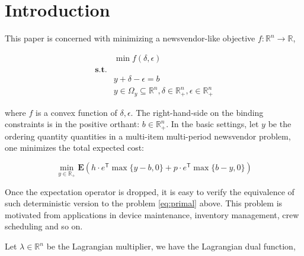 \documentclass[../main]{subfiles}
\begin{document}
\maketitle
{
  \setcounter{tocdepth}{3}
  \tableofcontents
}


\section{Introduction}\label{sec:introduction}

This paper is concerned with minimizing a newsvendor-like objective \(f: \mathbb R^n \to \mathbb R\),

\begin{equation}\label{eq:primal}
  \begin{aligned}
                  & \min f(\delta, \epsilon)                                                                       \\
    \mathbf{s.t.} &                                                                                                \\
                  & y + \delta - \epsilon = b                                                                      \\
                  & y \in \Omega_y \subseteq \mathbb{R}^n, \delta \in \mathbb{R}^n_+ , \epsilon \in \mathbb{R}^n_+
  \end{aligned}
\end{equation}

where \(f\) is a convex function of \(\delta, \epsilon\). The
right-hand-side on the binding constraints is in the positive orthant:
\(b \in \mathbb R_+^n\).  In the basic
settings, let \(y\) be the ordering quantity quantities in a multi-item multi-period
newsvendor problem, one minimizes the total expected cost:

\[\min_{y \in \mathbb R_+} \mathbf E\left(h\cdot e^\mathsf{T} \max\{y - b,  0\} + p \cdot e^\mathsf{T} \max\{b - y,  0\}\right)\]

Once the expectation operator is dropped, it is easy to verify the equivalence of such deterministic version
to the problem \eqref{eq:primal} above. This problem is motivated from applications
in device maintenance, inventory management, crew scheduling and so on.



Let \(\lambda\in\mathbb{R}^n\) be the Lagrangian multiplier, we have the Lagrangian dual function,
\end{document}
